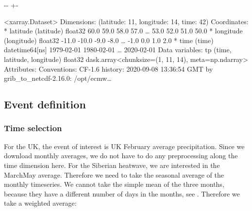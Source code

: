 \documentclass[letterpaper,10pt,english]{sphinxmanual}
\newlength\nbsphinxcodecellspacing
\begin{document}
{

\kern-\sphinxverbatimsmallskipamount\kern-\baselineskip
\kern+\FrameHeightAdjust\kern-\fboxrule
\vspace{\nbsphinxcodecellspacing}

\begin{sphinxVerbatim}[commandchars=\\\{\}]
\llap{\color{nbsphinxout}[13]:\,\hspace{\fboxrule}\hspace{\fboxsep}}<xarray.Dataset>
Dimensions:    (latitude: 11, longitude: 14, time: 42)
Coordinates:
  * latitude   (latitude) float32 60.0 59.0 58.0 57.0 {\ldots} 53.0 52.0 51.0 50.0
  * longitude  (longitude) float32 -11.0 -10.0 -9.0 -8.0 {\ldots} -1.0 0.0 1.0 2.0
  * time       (time) datetime64[ns] 1979-02-01 1980-02-01 {\ldots} 2020-02-01
Data variables:
    tp         (time, latitude, longitude) float32 dask.array<chunksize=(1, 11, 14), meta=np.ndarray>
Attributes:
    Conventions:  CF-1.6
    history:      2020-09-08 13:36:54 GMT by grib\_to\_netcdf-2.16.0: /opt/ecmw{\ldots}
\end{sphinxVerbatim}
}


\subsection{Event definition}
\label{\detokenize{Notebooks/2.Preprocess/2.Preprocess:Event-definition}}

\subsubsection{Time selection}
\label{\detokenize{Notebooks/2.Preprocess/2.Preprocess:Time-selection}}
For the UK, the event of interest is UK February average precipitation. Since we download monthly averages, we do not have to do any preprocessing along the time dimension here. For the Siberian heatwave, we are interested in the March\sphinxhyphen{}May average. Therefore we need to take the seasonal average of the monthly timeseries. We cannot take the simple mean of the three months, because they have a different number of days in the months, see . Therefore we take a weighted average:

{
\begin{sphinxVerbatim}[commandchars=\\\{\}]
\llap{\color{nbsphinxin}[14]:\,\hspace{\fboxrule}\hspace{\fboxsep}}  
\end{sphinxVerbatim}
}
\end{document}
